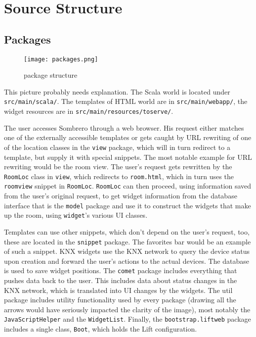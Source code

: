 \chapter{Source Structure}

\section{Packages}

  \begin{figure}[h]
  \centering
  \texttt{[image: packages.png]}
  \caption{package structure}
  \label{fig:packages}
  \end{figure}

This picture probably needs explanation. The Scala world is located under \lstinline!src/main/scala/!. The templates of HTML world are in \lstinline!src/main/webapp/!, the widget resources are in \lstinline!src/main/resources/toserve/!.

The user accesses Sombrero through a web browser. His request either matches one of the externally accessible templates or gets caught by URL rewriting of one of the location classes in the \lstinline!view! package, which will in turn redirect to a template, but supply it with special snippets. The most notable example for URL rewriting would be the room view. The user's request gets rewritten by the \lstinline!RoomLoc! class in \lstinline!view!, which redirects to \lstinline!room.html!, which in turn uses the \lstinline!roomview! snippet in \lstinline!RoomLoc!. \lstinline!RoomLoc! can then proceed, using information saved from the user's original request, to get widget information from the database interface that is the \lstinline!model! package and use it to construct the widgets that make up the room, using \lstinline!widget!'s various UI classes.

Templates can use other snippets, which don't depend on the user's request, too, these are located in the \lstinline!snippet! package. The favorites bar would be an example of such a snippet. KNX widgets use the KNX network to query the device status upon creation and forward the user's actions to the actual devices. The database is used to save widget positions. The \lstinline!comet! package includes everything that pushes data back to the user. This includes data about status changes in the KNX network, which is translated into UI changes by the widgets. The util package includes utility functionality used by every package (drawing all the arrows would have seriously impacted the clarity of the image), most notably the \lstinline!JavaScriptHelper! and the \lstinline!WidgetList!. Finally, the \lstinline!bootstrap.liftweb! package includes a single class, \lstinline!Boot!, which holds the Lift configuration.



